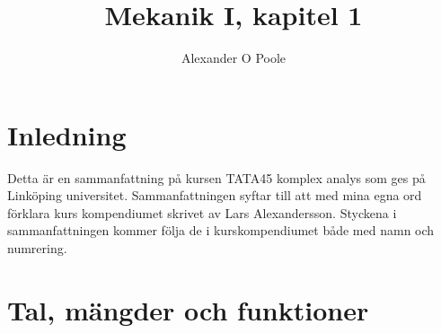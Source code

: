 \documentclass[a4paper,12pt]{article}
\title{Mekanik I, kapitel 1}
\author{Alexander O Poole}
\begin{document}
\maketitle
\thispagestyle{empty}
\newpage


\section*{Inledning}
Detta är en sammanfattning på kursen TATA45 komplex analys som ges på Linköping universitet. 
Sammanfattningen syftar till att med mina egna ord förklara kurs kompendiumet skrivet av Lars Alexandersson. 
Styckena i sammanfattningen kommer följa de i kurskompendiumet både med namn och numrering. 

\pagebreak

\tableofcontents

\pagebreak


\section{Tal, mängder och funktioner}
\sub
\end{document}
